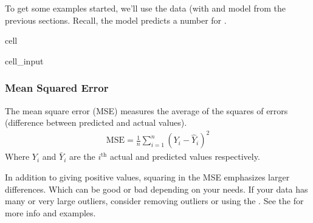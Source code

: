 \documentclass[letterpaper,10pt,english]{jupyterBook}
\begin{document}
\sphinxAtStartPar
To get some examples started, we’ll use the data (with  and model from the previous sections. Recall, the model predicts a number for .

\begin{sphinxuseclass}{cell}\begin{sphinxVerbatimInput}

\begin{sphinxuseclass}{cell_input}
\begin{sphinxVerbatim}[commandchars=\\\{\}]
    

  
  
\end{sphinxVerbatim}

\end{sphinxuseclass}\end{sphinxVerbatimInput}

\end{sphinxuseclass}

\subsubsection{Mean Squared Error}
\label{\detokenize{task2_c/example_sup_reg/sup_reg_ex_accuracy:mean-squared-error}}\label{\detokenize{task2_c/example_sup_reg/sup_reg_ex_accuracy:sup-reg-ex-develop-accuracy-mse}}
\sphinxAtStartPar
The mean square error (MSE) measures the average of the squares of errors (difference between predicted and actual values).
\begin{equation*}
\begin{split}\text{MSE} = \frac{1}{n} \sum^{n}_{i=1} (Y_i - \hat{Y}_i)^{2}\end{split}
\end{equation*}
\sphinxAtStartPar
Where \(Y_i\) and \(\bar{Y}_i\) are the \(i^{\text{th}}\) actual and predicted values respectively.

\sphinxAtStartPar
In addition to giving positive values, squaring in the MSE emphasizes larger differences. Which can be good or bad depending on your needs. If your data has many or very large outliers, consider removing outliers or using the . See the  for more info and examples.
\end{document}
